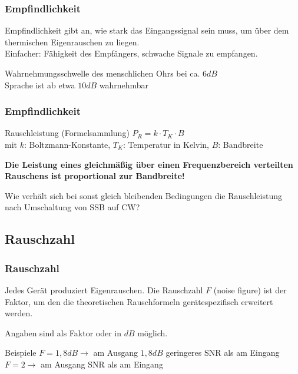 \begin{frame}
  \frametitle{Empfindlichkeit}

  Empfindlichkeit gibt an, wie stark das Eingangssignal sein muss, um über
  dem thermischen Eigenrauschen zu liegen.\\[.5em]

  Einfacher: Fähigkeit des Empfängers, schwache Signale zu empfangen.

  \bigskip

  Wahrnehmungsschwelle des menschlichen Ohrs bei ca. $6 dB$\\
  Sprache ist ab etwa $10 dB$ wahrnehmbar

\end{frame}

\begin{frame}
  \frametitle{Empfindlichkeit}

  \begin{block}{Rauschleistung (Formelsammlung)}
    $P_R = k \cdot T_K \cdot B$\\
    mit $k$: Boltzmann-Konstante, $T_K$: Temperatur in Kelvin, $B$: Bandbreite
  \end{block}

  \bigskip

  \textbf{Die Leistung eines gleichmäßig über einen Frequenzbereich
  verteilten Rauschens ist proportional zur Bandbreite!}

  \bigskip

  \begin{exampleblock}{Wie verhält sich bei sonst gleich bleibenden Bedingungen die
    Rauschleistung nach Umschaltung von SSB auf CW?}
  \end{exampleblock}

\end{frame}

\subsection{Rauschzahl}

\begin{frame}
  \frametitle{Rauschzahl}

  Jedes Gerät produziert Eigenrauschen. Die Rauschzahl $F$ (noise figure) ist
  der Faktor, um den die theoretischen Rauschformeln gerätespezifisch
  erweitert werden.

  \bigskip

  Angaben sind als Faktor oder in $dB$ möglich.

  \bigskip

  \begin{exampleblock}{Beispiele}
    $F=1,8 dB \rightarrow$ am Ausgang $1,8dB$ geringeres SNR als am Eingang\\
    $F=2 \rightarrow$ am Ausgang   SNR als am Eingang
  \end{exampleblock}

\end{frame}

